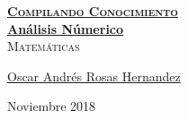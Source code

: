 \documentclass[12pt, fleqn]{report}                             %
\author{Oscar Andrés Rosas}                                     %
\theoremstyle{break}                                            %
\begin{document}
\begin{titlepage}
    
    \pagecolor{TitlePageColor}                                      %
    \color{white}                                                   %

    \vspace                                                         %
    \baselineskip                                                   %

    \makebox[0pt][l]{\rule{1.3\textwidth}{3pt}}                     %
    
    \href{https://compilandoconocimiento.com}                       %
    {\textbf{\textsc{\Huge Compilando Conocimiento}}}\\[2.7cm]      %

    \href{\ProjectNameLink}                                         %
    {\fontsize{45}{58}\selectfont \textbf{Análisis Númerico}}\\[0.5cm] %
    \textcolor{ColorSubtext}{\textsc{\Huge Matemáticas}}            %
    
    \vfill                                                          %
    
    \href{\ProjectAuthorLink}                                       %
    {\LARGE \textsf{Oscar Andrés Rosas Hernandez}}                  %

    \vspace                                                         %
    \baselineskip                                                   %
    
    {\large \textsf{Noviembre 2018}}                                %
\end{titlepage}


\restoregeometry                                                    %
\nopagecolor                                                        %
\end{document}
